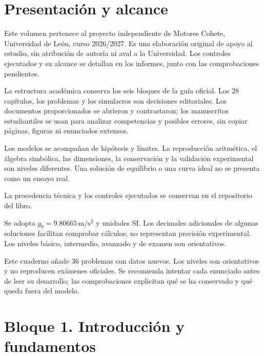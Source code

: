 
\renewcommand{\studiumvolumetype}{problemas}

\frontmatter
\studiumreadingguide
\chapter*{Presentación y alcance}
Este volumen pertenece al proyecto independiente de Motores Cohete, Universidad de León, curso 2026/2027. Es una elaboración original de apoyo al estudio, sin atribución de autoría ni aval a la Universidad. Los controles ejecutados y su alcance se detallan en los informes, junto con las comprobaciones pendientes.

La estructura académica conserva los seis bloques de la guía oficial. Los 28 capítulos, los problemas y los simulacros son decisiones editoriales. Los documentos proporcionados se abrieron y contrastaron; los manuscritos estudiantiles se usan para analizar competencias y posibles errores, sin copiar páginas, figuras ni enunciados extensos.

Los modelos se acompañan de hipótesis y límites. La reproducción aritmética, el álgebra simbólica, las dimensiones, la conservación y la validación experimental son niveles diferentes. Una solución de equilibrio o una curva ideal no se presenta como un ensayo real.

La procedencia técnica y los controles ejecutados se conservan en el repositorio del libro.

Se adopta $g_0=9.80665\,\mathrm{m/s^2}$ y unidades SI. Los decimales adicionales de algunas soluciones facilitan comprobar cálculos; no representan precisión experimental. Los niveles básico, intermedio, avanzado y de examen son orientativos.

Este cuaderno añade 36 problemas con datos nuevos. Los niveles son orientativos y no reproducen exámenes oficiales. Se recomienda intentar cada enunciado antes de leer su desarrollo; las comprobaciones explicitan qué se ha conservado y qué queda fuera del modelo.
\tableofcontents
\mainmatter
\chapter{Bloque 1. Introducción y fundamentos}

